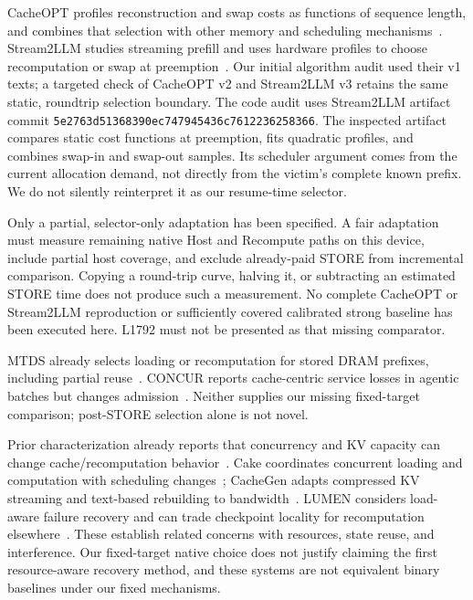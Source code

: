 \documentclass[10pt,a4paper]{article}
\begin{document}
CacheOPT profiles reconstruction and swap costs as functions of sequence
length, and combines that selection with other memory and scheduling
mechanisms~\cite{cacheopt}. Stream2LLM studies streaming prefill and uses
hardware profiles to choose recomputation or swap at preemption~\cite{stream2llm}.
Our initial algorithm audit used their v1 texts; a targeted check of CacheOPT
v2 and Stream2LLM v3 retains the same static, roundtrip selection boundary.
The code audit uses Stream2LLM artifact commit \texttt{5e2763d51368390ec747945436c7612236258366}.
The inspected artifact compares static cost functions at preemption, fits
quadratic profiles, and combines swap-in and swap-out samples. Its scheduler
argument comes from the current allocation demand, not directly from the
victim's complete known prefix. We do not silently reinterpret it as our
resume-time selector.

Only a partial, selector-only adaptation has been specified. A fair adaptation
must measure remaining native Host and Recompute paths on this device, include
partial host coverage, and exclude already-paid STORE from incremental
comparison. Copying a round-trip curve, halving it, or subtracting an estimated
STORE time does not produce such a measurement. No complete CacheOPT or
Stream2LLM reproduction or sufficiently covered calibrated strong baseline has
been executed here. L1792 must not be presented as that missing comparator.

MTDS already selects loading or recomputation for stored DRAM prefixes,
including partial reuse~\cite{mtds}. CONCUR reports cache-centric service
losses in agentic batches but changes admission~\cite{concur}. Neither supplies
our missing fixed-target comparison; post-STORE selection alone is not novel.

Prior characterization already reports that concurrency and KV capacity can
change cache/recomputation behavior~\cite{unboxkv}. Cake coordinates concurrent
loading and computation with scheduling changes~\cite{cake}; CacheGen adapts
compressed KV streaming and text-based rebuilding to bandwidth~\cite{cachegen}.
LUMEN considers load-aware failure recovery and can trade checkpoint locality
for recomputation elsewhere~\cite{lumen}. These establish related concerns
with resources, state reuse, and interference. Our fixed-target native choice
does not justify claiming the first resource-aware recovery method, and these
systems are not equivalent binary baselines under our fixed mechanisms.
\end{document}
